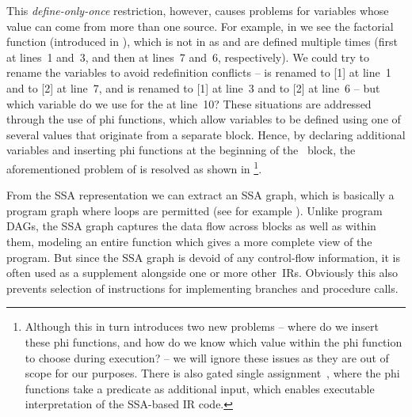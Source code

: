This \emph{define-only-once} restriction, however, causes problems for variables
whose value can come from more than one source.
%
For example, in
 we see the factorial \gls{function}
(introduced in ), which is not in \tSSAform as
 and  are defined multiple times (first at lines~1
and~3, and then at lines~7 and~6, respectively).
%
We could try to rename the
variables to avoid redefinition conflicts --  is renamed to
[1] at line~1 and to [2] at line~7, and  is
renamed to [1] at line~3 and to [2] at line~6 -- but
which variable do we use for the  at line~10? These situations
are addressed through the use of \glspl{phi function}, which allow variables to
be defined using one of several values that originate from a separate
\gls{block}.
%
Hence, by declaring additional variables and inserting \glspl{phi
  function} at the beginning of the ~\gls{block}, the
aforementioned problem of  is resolved as shown in
\footnote{Although this in turn introduces two new
  problems -- where do we insert these \glspl{phi function}, and how do we know
  which value within the \gls{phi function} to choose during execution? -- we
  will ignore these issues as they are out of scope for our purposes.
%
There is
  also \gls{gated single assignment}~\cite{Ballance1990}, where the \glspl{phi
    function} take a predicate as additional input, which enables executable
  interpretation of the \gls{SSA}-based \gls{IR} code.}.

%    

From the \gls{SSA} representation we can extract an \gls{SSA graph}, which is
basically a \gls{program graph} where \glspl{loop} are permitted (see for
example ).
%
Unlike \glspl{program DAG}, the
\gls{SSA graph} captures the data flow across \glspl{block} as well as within
them, modeling an entire \gls{function} which gives a more complete view of the
\gls{program}.
%
But since the \gls{SSA graph} is devoid of any control-flow
information, it is often used as a supplement alongside one or more
other~\glspl{IR}.
%
Obviously this also prevents selection of \glspl{instruction}
for implementing branches and procedure calls.


